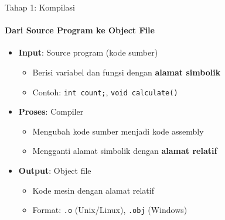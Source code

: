 \documentclass[10pt,aspectratio=169]{beamer}
\begin{document}
\begin{frame}{Tahap 1: Kompilasi}
    \framesubtitle{Dari Source Program ke Object File}
    
    \begin{itemize}
        \item \textbf{Input}: Source program (kode sumber)
        \begin{itemize}
            \item Berisi variabel dan fungsi dengan \textbf{alamat simbolik}
            \item Contoh: \texttt{int count;}, \texttt{void calculate()}
        \end{itemize}
        
        \item \textbf{Proses}: Compiler
        \begin{itemize}
            \item Mengubah kode sumber menjadi kode assembly
            \item Mengganti alamat simbolik dengan \textbf{alamat relatif}
        \end{itemize}
        
        \item \textbf{Output}: Object file
        \begin{itemize}
            \item Kode mesin dengan alamat relatif
            \item Format: \texttt{.o} (Unix/Linux), \texttt{.obj} (Windows)
        \end{itemize}
    \end{itemize}
\end{frame}
\end{document}
